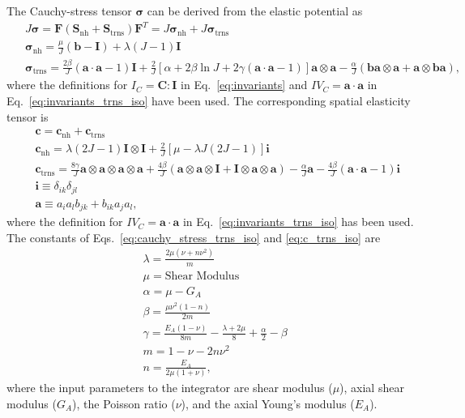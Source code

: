 \documentclass[12pt,aps,pre]{revtex4}
\begin{document}
The Cauchy-stress tensor $\pmb{\sigma}$ can be derived from the elastic potential as
%
\begin{align}
&J\pmb{\sigma} = \pmb{F} \left(\pmb{S}_{\text{nh}} + \pmb{S}_{\text{trns}}\right)\pmb{F}^T = J\pmb{\sigma}_{\text{nh}} +J\pmb{\sigma}_{\text{trns}} \nonumber\\ \ \
%
&\pmb{\sigma}_{\text{nh}} = \frac{\mu}{J}\left(\pmb{b} - \pmb{I}\right) + \lambda \left(J - 1\right) \pmb{I} \nonumber\\ \ \
%
&\pmb{\sigma}_{\text{trns}} = \frac{2\beta}{J}\left(\pmb{a}\cdot\pmb{a} -1\right)\pmb{I} + \frac{2}{J}\left[\alpha + 2\beta \ln J + 2\gamma(\pmb{a}\cdot\pmb{a}-1) \right] \pmb{a} \otimes \pmb{a} - \frac{\alpha}{J}(\pmb{b}\pmb{a}\otimes\pmb{a} + \pmb{a} \otimes \pmb{b} \pmb{a}),
\label{eq:cauchy_stress_trns_iso}
\end{align}
%
where the definitions for $I_C=\pmb{C}:\pmb{I}$ in Eq.\ \eqref{eq:invariants} and $IV_C=\pmb{a}\cdot\pmb{a}$ in Eq.\ \eqref{eq:invariants_trns_iso} have been used. The corresponding spatial elasticity tensor is
\begin{align}
&\pmb{c} = \pmb{c}_{\text{nh}} + \pmb{c}_{\text{trns}} \nonumber\\
%
&\pmb{c}_{\text{nh}} = \lambda(2J-1)\pmb{I} \otimes \pmb{I}+\frac{2}{J}\left[\mu - \lambda J(2J-1)\right]\pmb{i} \nonumber\\ \ \
%
&\pmb{c}_{\text{trns}} = \frac{8\gamma}{J}\pmb{a} \otimes \pmb{a} \otimes \pmb{a} \otimes \pmb{a} + \frac{4\beta}{J}\left(\pmb{a}\otimes\pmb{a}\otimes\pmb{I}+\pmb{I}\otimes\pmb{a}\otimes\pmb{a} \right) - \frac{\alpha}{J} \textbf{a} - \frac{4\beta}{J}(\pmb{a}\cdot\pmb{a}-1)\pmb{i} \nonumber\\ \ \
%
&\pmb{i} \equiv \delta_{ik}\delta_{jl} \nonumber\\
%
&\textbf{a} \equiv a_i a_l b_{jk} + b_{ik} a_j a_l,
\label{eq:c_trns_iso}
\end{align}
%
where the definition for $IV_C=\pmb{a}\cdot\pmb{a}$ in Eq.\ \eqref{eq:invariants_trns_iso} has been used. The constants of Eqs.\ \eqref{eq:cauchy_stress_trns_iso} and \eqref{eq:c_trns_iso} are \cite{Bonet:1998vc}
%
\begin{align}
&\lambda = \frac{2\mu (\nu+n\nu^2)}{m} \nonumber\\ 
%
&\mu = \text{Shear Modulus} \nonumber\\
%
&\alpha = \mu - G_A \nonumber\\
%
&\beta = \frac{\mu \nu^2(1-n)}{2m} \nonumber\\ 
%
&\gamma = \frac{E_A(1-\nu)}{8m} - \frac{\lambda+2\mu}{8} + \frac{\alpha}{2} - \beta \nonumber\\
%
&m = 1 - \nu - 2 n\nu^2 \nonumber\\
%
&n = \frac{E_A}{2\mu(1+\nu)},
\label{eq:trns_iso_constants}
\end{align}
%
where the input parameters to the integrator are shear modulus ($\mu$), axial shear modulus ($G_A$), the Poisson ratio ($\nu$), and the axial Young's modulus ($E_A$).  
\end{document}

